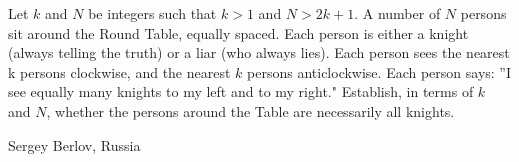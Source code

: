Let $k$ and $N$ be integers such that $k > 1$ and $N > 2k + 1$. A number of $N$ persons sit around the Round Table, equally spaced. Each person is either a knight (always telling the truth) or a liar (who always lies). Each person sees the nearest k persons clockwise, and the nearest $k$ persons anticlockwise. Each person says: ''I see equally many knights to my left and to my right." Establish, in terms of $k$ and $N$, whether the persons around the Table are necessarily all knights.

Sergey Berlov, Russia